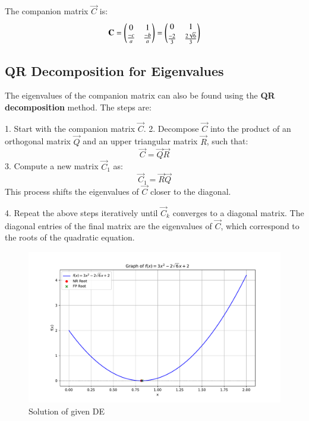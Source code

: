 \documentclass[journal,12pt,onecolumn]{IEEEtran}
\theoremstyle{remark}
\begin{document}
The companion matrix \(\vec{C}\) is:
\begin{align}
    \mathbf{C} = \begin{pmatrix}0 & 1 \\ \frac{-c}{a} & \frac{-b}{a}\end{pmatrix} = \begin{pmatrix}0 & 1 \\ \frac{-2}{3} & \frac{2\sqrt{6}}{3}\end{pmatrix}
\end{align}

\subsection*{QR Decomposition for Eigenvalues}

The eigenvalues of the companion matrix can also be found using the \textbf{QR decomposition} method. The steps are:

1. Start with the companion matrix \(\vec{C}\).
2. Decompose \(\vec{C}\) into the product of an orthogonal matrix \(\vec{Q}\) and an upper triangular matrix \(\vec{R}\), such that:
   \[
   \vec{C} = \vec{Q}\vec{R}
   \]
3. Compute a new matrix \(\vec{C}_1\) as:
   \[
   \vec{C}_1 = \vec{R}\vec{Q}
   \]
   This process shifts the eigenvalues of \(\vec{C}\) closer to the diagonal.

4. Repeat the above steps iteratively until \(\vec{C}_k\) converges to a diagonal matrix. The diagonal entries of the final matrix are the eigenvalues of \(\vec{C}\), which correspond to the roots of the quadratic equation.

\begin{figure}[h]
	\centering
	\includegraphics[width=\columnwidth]{figs/fig.pdf}
	\caption{Solution of given DE}
	\label{fig}
\end{figure}
\end{document}
